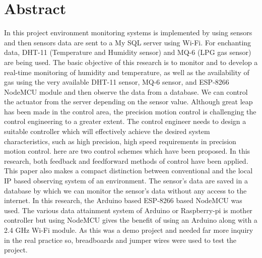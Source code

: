 \chapter*{\textbf{Abstract}}
In this project environment monitoring systems is implemented by using sensors and then sensors data are sent to a My SQL server using Wi-Fi. For enchanting data, DHT-11 (Temperature and Humidity sensor) and MQ-6 (LPG gas sensor) are being used. The basic objective of this research is to monitor and to develop a real-time monitoring of humidity and temperature, as well as the availability of gas using the very available DHT-11 sensor, MQ-6 sensor, and ESP-8266 NodeMCU module and then observe the data from a database. We can control the actuator from the server depending on the sensor value. Although great leap has been made in the control area, the precision motion control is challenging the control engineering to a greater extent. The control engineer needs to design a suitable controller which will effectively achieve the desired system characteristics, such as high precision, high speed requirements in precision motion control. here are two control schemes which have been proposed. In this research, both feedback and feedforward methods of control have been applied. This paper also makes a compact distinction between conventional and the local IP based observing system of an environment. The sensor's data are saved in a database by which we can monitor the sensor’s data without any access to the internet. In this research, the Arduino based ESP-8266 based NodeMCU was used. The various data attainment system of Arduino or Raspberry-pi is mother controller but using NodeMCU gives the benefit of using an Arduino along with a 2.4 GHz Wi-Fi module. As this was a demo project and needed far more inquiry in the real practice so, breadboards and jumper wires were used to test the project. 